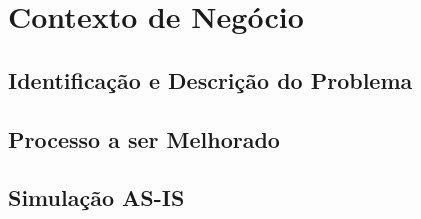 \chapter[Contexto de Negócio]{Contexto de Negócio}
\label{chap:contexto}
	

	\section[Identificação e Descrição do Problema]{Identificação e Descrição do Problema}
	\label{sec:contexto_problema}
		

	\section[Processo a ser Melhorado]{Processo a ser Melhorado}
	\label{sec:contexto_problema}
		

	\section[Simulação AS-IS]{Simulação AS-IS}
	\label{sec:contexto_asis}
		